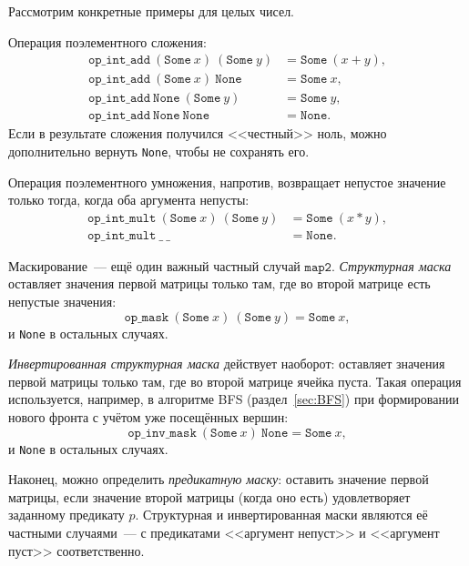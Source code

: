 Рассмотрим конкретные примеры для целых чисел.

Операция поэлементного сложения:
\begin{align*}
    \texttt{op\_int\_add}\ (\texttt{Some}\ x)\ (\texttt{Some}\ y) &= \texttt{Some}\ (x + y), \\
    \texttt{op\_int\_add}\ (\texttt{Some}\ x)\ \texttt{None} &= \texttt{Some}\ x, \\
    \texttt{op\_int\_add}\ \texttt{None}\ (\texttt{Some}\ y) &= \texttt{Some}\ y, \\
    \texttt{op\_int\_add}\ \texttt{None}\ \texttt{None} &= \texttt{None}.
\end{align*}
Если в результате сложения получился <<честный>> ноль, можно дополнительно вернуть \texttt{None}, чтобы не сохранять его.

Операция поэлементного умножения, напротив, возвращает непустое значение только тогда, когда оба аргумента непусты:
\begin{align*}
    \texttt{op\_int\_mult}\ (\texttt{Some}\ x)\ (\texttt{Some}\ y) &= \texttt{Some}\ (x * y), \\
    \texttt{op\_int\_mult}\ \_\ \_ &= \texttt{None}.
\end{align*}

Маскирование~--- ещё один важный частный случай $\texttt{map2}$.
\emph{Структурная маска} оставляет значения первой матрицы только там, где во второй матрице есть непустые значения:
\[
    \texttt{op\_mask}\ (\texttt{Some}\ x)\ (\texttt{Some}\ y) = \texttt{Some}\ x,
\]
и \texttt{None} в остальных случаях.

\emph{Инвертированная структурная маска} действует наоборот: оставляет значения первой матрицы только там, где во второй матрице ячейка пуста.
Такая операция используется, например, в алгоритме BFS (раздел~\ref{sec:BFS}) при формировании нового фронта с учётом уже посещённых вершин:
\[
    \texttt{op\_inv\_mask}\ (\texttt{Some}\ x)\ \texttt{None} = \texttt{Some}\ x,
\]
и \texttt{None} в остальных случаях.

Наконец, можно определить \emph{предикатную маску}: оставить значение первой матрицы, если значение второй матрицы (когда оно есть) удовлетворяет заданному предикату $p$.
Структурная и инвертированная маски являются её частными случаями~--- с предикатами <<аргумент непуст>> и <<аргумент пуст>> соответственно.

